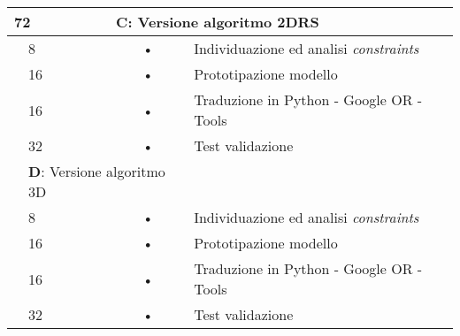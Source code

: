 \begin{center}
\begin{tabular}{|l|l|c l|}
		\multicolumn{2}{|l|}{72}	&	\multicolumn{2}{l|}{\textbf{C}: Versione algoritmo 2DRS}  \\
		\hline
		\multirow{5}{1cm}{ } & 8  & \hspace{5mm}•\hspace{2mm} & Individuazione ed analisi \textit{constraints}       \\
		\multirow{3}{1cm}{ } & 16 & \hspace{5mm}•\hspace{2mm} & Prototipazione modello                               \\
		\multirow{5}{1cm}{ } & 16 & \hspace{5mm}•\hspace{2mm} & Traduzione in Python - Google OR - Tools             \\
		\multirow{5}{1cm}{ } & 32 & \hspace{5mm}•\hspace{2mm} & Test validazione                                     \\	
		\hline
																																					
		\multicolumn{2}{|l|}{72}	&	\multicolumn{2}{l|}{\textbf{D}: Versione algoritmo 3D}   \\
		\hline
		\multirow{5}{1cm}{ } & 8  & \hspace{5mm}•\hspace{2mm} & Individuazione ed analisi \textit{constraints}       \\
		\multirow{3}{1cm}{ } & 16 & \hspace{5mm}•\hspace{2mm} & Prototipazione modello                               \\
		\multirow{5}{1cm}{ } & 16 & \hspace{5mm}•\hspace{2mm} & Traduzione in Python - Google OR - Tools             \\
		\multirow{5}{1cm}{ } & 32 & \hspace{5mm}•\hspace{2mm} & Test validazione                                     \\
		\hline
																																							

\end{tabular}
\end{center}

